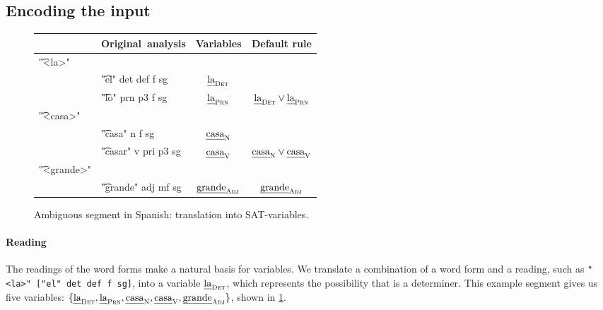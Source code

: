\subsection{Encoding the input}


\begin{figure}[h]
\centering
\begin{tabular}{p{0.6cm} l | c | c }
   & \textbf{Original~analysis} 
                & \textbf{Variables}
                              & \textbf{Default rule} \\ \hline
\t{"<la>"}   &   &            &  {\small {}} \\
  & \t{"el" 
  det def f sg}  & $\text{\em la}_{\text{\sc Det}}$   &  \\
  & \t{"lo" 
  prn p3 f sg}   & $\text{\em la}_{\text{\sc Prn}}$   &   $\text{\em la}_{\text{\sc Det}} \vee \text{\em la}_{\text{\sc Prn}}$ \\
\t{"<casa>"} &   &            &   \\
  & \t{"casa" 
  n f sg}        & $\text{\em casa}_{\text{\sc N}}$   &  \\
  & \t{"casar"
   v pri p3 sg}  & $\text{\em casa}_{\text{\sc V}}$   & $\text{\em casa}_{\text{\sc N}} \vee \text{\em casa}_{\text{\sc V}}$  \\
\t{"<grande>"} & &            & \\
  & \t{"grande" 
  adj mf sg}   & $\text{\em grande}_{\text{\sc Adj}}$ & $\text{\em grande}_{\text{\sc Adj}}$
\end{tabular}
\caption{Ambiguous segment in Spanish: translation into SAT-variables.}
\label{fig:laCasaGrande}
\end{figure}



\paragraph{Reading}
The readings of the word forms make a natural basis for variables.
We translate a combination of a word form and a reading, such as \texttt{"<la>" ["el" det def f sg]}, into a variable $\text{\em la}_{\text{\sc Det}}$, which represents the possibility that \la{} is a determiner. This example segment gives us five variables: $\{ \text{\em la}_{\text{\sc Det}} , \text{\em la}_{\text{\sc Prn}} , \text{\em casa}_{\text{\sc N}} , \text{\em casa}_{\text{\sc V}},  \text{\em grande}_{\text{\sc Adj}} \}$, shown in \ref{fig:laCasaGrande}.

